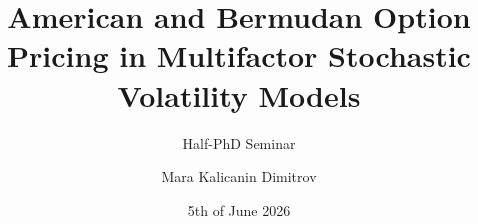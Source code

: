 \documentclass[aspectratio=169,professionalfonts,11pt]{beamer}
\title[American and Bermudan Option Pricing in Multifactor Stochastic Volatility Models]{American and Bermudan Option Pricing in Multifactor Stochastic Volatility Models}
\subtitle{Half-PhD Seminar}
\author{Mara Kalicanin Dimitrov}
\institute{}
\date{5th of June 2026}
\begin{document}





\appendix
\beginbackupslides
%
\end{document}
